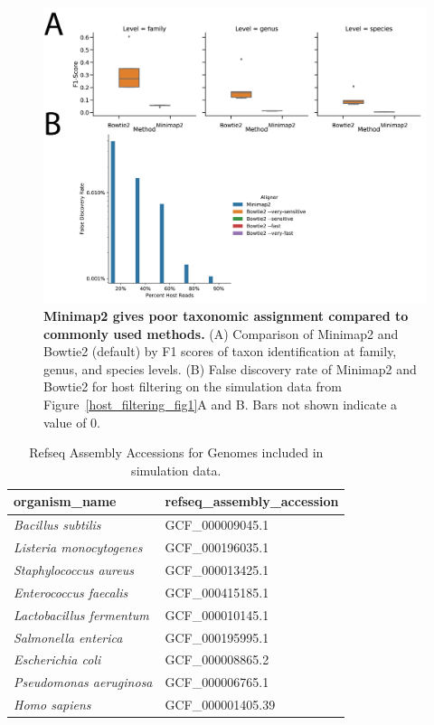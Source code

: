 \begin{figure}[htbp]
\centering
\includegraphics[width=\textwidth]{host-filtering-figures/figureS02.png}
\caption[Minimap2 gives poor taxonomic assignment compared to commonly used methods.]{\textbf{Minimap2 gives poor taxonomic assignment compared to commonly used methods.} (A) Comparison of Minimap2 and Bowtie2 (default) by F1 scores of taxon identification at family, genus, and species levels. (B) False discovery rate of Minimap2 and Bowtie2 for host filtering on the simulation data from Figure~\ref{host_filtering_fig1}A and B. Bars not shown indicate a value of 0.}
\label{host_filtering_figS2}
\end{figure}

\begin{table}

\caption[Refseq Assembly Accessions for Genomes included in simulation data]{Refseq Assembly Accessions for Genomes included in simulation data.}
\label{host_filtering_table_S1}

\centering
\begin{tabular}{ll} \hline
organism\_name          & refseq\_assembly\_accession  \\ 
\hline
\textit{Bacillus subtilis}       & GCF\_000009045.1             \\
\textit{Listeria monocytogenes}  & GCF\_000196035.1             \\
\textit{Staphylococcus aureus}   & GCF\_000013425.1             \\
\textit{Enterococcus faecalis}   & GCF\_000415185.1             \\
\textit{Lactobacillus fermentum} & GCF\_000010145.1             \\
\textit{Salmonella enterica}     & GCF\_000195995.1             \\
\textit{Escherichia coli }       & GCF\_000008865.2             \\
\textit{Pseudomonas aeruginosa } & GCF\_000006765.1             \\
\textit{Homo sapiens}          & GCF\_000001405.39           \\ \hline
\end{tabular}

\end{table}

